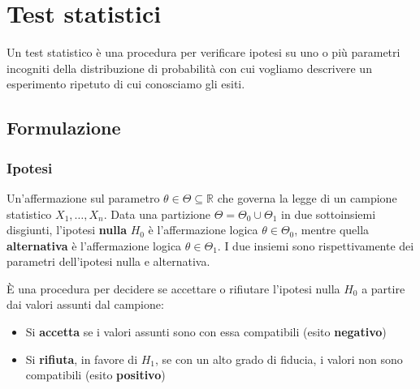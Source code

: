 \newpage
\section{Test statistici}
Un test statistico è una procedura per verificare ipotesi su uno o più parametri incogniti della distribuzione di probabilità con cui vogliamo descrivere un esperimento ripetuto di cui conosciamo gli esiti.

\subsection{Formulazione}
\subsubsection{Ipotesi}
\begin{definition}
	Un'affermazione sul parametro $\theta \in \Theta \subseteq \mathbb{R}$ che governa la legge di un campione statistico $X_1, \ldots, X_n$. Data una partizione $\Theta = \Theta_0 \cup \Theta_1$  in due sottoinsiemi disgiunti, l'ipotesi \textbf{nulla} $H_0$ è l'affermazione logica $\theta \in \Theta_0$, mentre quella \textbf{alternativa} è l'affermazione logica $\theta \in \Theta_1$. I due insiemi sono rispettivamente dei parametri dell'ipotesi nulla e alternativa.
\end{definition}

\begin{definition}
	È una procedura per decidere se accettare o rifiutare l'ipotesi nulla $H_0$ a partire dai valori assunti dal campione:
	\begin{itemize}
		\item Si \textbf{accetta} se i valori assunti sono con essa compatibili (esito \textbf{negativo})
		\item Si \textbf{rifiuta}, in favore di $H_1$, se con un alto grado di fiducia, i valori non sono compatibili (esito \textbf{positivo})
	\end{itemize}
\end{definition}
